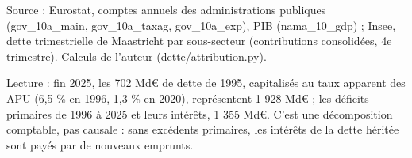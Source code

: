 Source : Eurostat, comptes annuels des administrations publiques (gov\_10a\_main, gov\_10a\_taxag, gov\_10a\_exp), PIB (nama\_10\_gdp) ; Insee, dette trimestrielle de Maastricht par sous-secteur (contributions consolidées, 4e trimestre). Calculs de l'auteur (dette/attribution.py).\par Lecture : fin 2025, les 702 Md\euro{} de dette de 1995, capitalisés au taux apparent des APU (6,5 \% en 1996, 1,3 \% en 2020), représentent 1 928 Md\euro{} ; les déficits primaires de 1996 à 2025 et leurs intérêts, 1 355 Md\euro{}. C'est une décomposition comptable, pas causale : sans excédents primaires, les intérêts de la dette héritée sont payés par de nouveaux emprunts.
